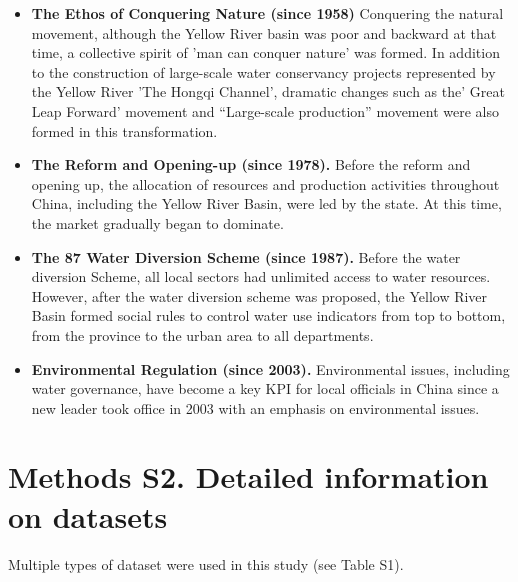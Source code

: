 \documentclass[9pt,twoside,lineno]{pnas-new}
\begin{document}
\begin{itemize}
    \item \textbf{The Ethos of Conquering Nature (since 1958)} Conquering the natural movement, although the Yellow River basin was poor and backward at that time, a collective spirit of 'man can conquer nature' was formed. In addition to the construction of large-scale water conservancy projects represented by the Yellow River 'The Hongqi Channel', dramatic changes such as the' Great Leap Forward' movement and ``Large-scale production'' movement were also formed in this transformation. 
    \item \textbf{The Reform and Opening-up (since 1978).} Before the reform and opening up, the allocation of resources and production activities throughout China, including the Yellow River Basin, were led by the state. At this time, the market gradually began to dominate. 
    \item \textbf{The 87 Water Diversion Scheme (since 1987).} Before the water diversion Scheme, all local sectors had unlimited access to water resources. However, after the water diversion scheme was proposed, the Yellow River Basin formed social rules to control water use indicators from top to bottom, from the province to the urban area to all departments. 
    \item \textbf{Environmental Regulation (since 2003).} Environmental issues, including water governance, have become a key KPI for local officials in China since a new leader took office in 2003 with an emphasis on environmental issues. 
\end{itemize}



\newpage
\section*{Methods S2. Detailed information on datasets}

Multiple types of dataset were used in this study (see Table S1). 
\end{document}
